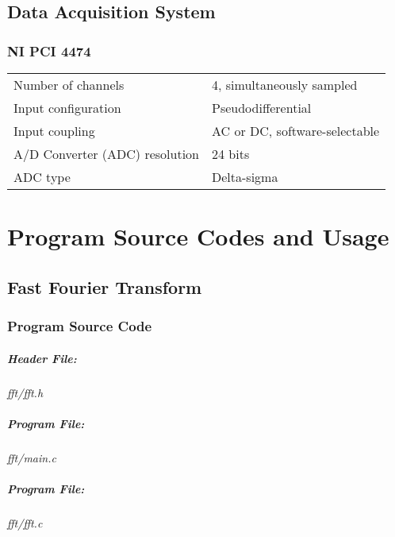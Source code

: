 \documentclass[a4paper,11pt]{report}
\begin{document}
\section{Data Acquisition System}
\subsection*{NI PCI 4474} 
\begin{tabular}{ll}
Number of channels & 4, simultaneously sampled \\
Input configuration & Pseudodifferential \\
Input coupling & AC or DC, software-selectable \\
A/D Converter (ADC) resolution & 24 bits \\
ADC type & Delta-sigma 
\end{tabular}

\chapter{Program Source Codes and Usage}
\section{Fast Fourier Transform} 
\subsection{Program Source Code} \label{pscfft}
\paragraph{Header File:} \textit{fft/fft.h}
\vspace{5pt}
{\scriptsize
\begin{lgrind}

\end{lgrind}
}

\paragraph{Program File:} \textit{fft/main.c}
\vspace{5pt}
{\scriptsize
\begin{lgrind}

\end{lgrind}
}

\paragraph{Program File:} \textit{fft/fft.c}
\vspace{5pt}
{\scriptsize
\begin{lgrind}

\end{lgrind}
}
\end{document}
